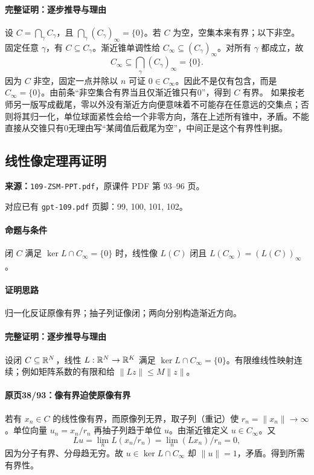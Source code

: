 \paragraph{完整证明：逐步推导与理由}

设 $C=\bigcap_\gamma C_\gamma$，且 $\bigcap_\gamma(C_\gamma)_\infty=\{0\}$。若 $C$ 为空，空集本来有界；以下非空。
固定任意 $\gamma$，有 $C\subseteq C_\gamma$。渐近锥单调性给 $C_\infty\subseteq(C_\gamma)_\infty$。对所有 $\gamma$ 都成立，故
\[C_\infty\subseteq\bigcap_\gamma(C_\gamma)_\infty=\{0\}.\]
因为 $C$ 非空，固定一点并除以 $n$ 可证 $0\in C_\infty$。因此不是仅有包含，而是 $C_\infty=\{0\}$。由前条“非空集合有界当且仅渐近锥只有0”，得到 $C$ 有界。
如果按老师另一版写成截尾，零以外没有渐近方向便意味着不可能存在任意远的交集点；否则将其归一化，单位球面紧性会给一个非零方向，落在上述所有锥中，矛盾。不能直接从交锥只有0无理由写“某阈值后截尾为空”，中间正是这个有界性判据。

\clearpage\subsection{线性像定理再证明}
\textbf{来源：}\texttt{109-ZSM-PPT.pdf}，原课件 PDF 第 93--96 页。\par
对应已有 \texttt{gpt-109.pdf} 页脚：99, 100, 101, 102。\par
\paragraph{命题与条件}闭 $C$ 满足 $\ker L\cap C_\infty=\{0\}$ 时，线性像 $L(C)$ 闭且 $L(C_\infty)=(L(C))_\infty$。
\paragraph{证明思路}归一化反证原像有界；抽子列证像闭；两向分别构造渐近方向。
\paragraph{完整证明：逐步推导与理由}

设闭 $C\subseteq\mathbb{R}^N$，线性 $L:\mathbb{R}^N\to\mathbb{R}^K$ 满足 $\ker L\cap C_\infty=\{0\}$。有限维线性映射连续；例如矩阵系数的有限和给 $\|Lz\|\le M\|z\|$。
\paragraph{原页38/93：像有界迫使原像有界}
若有 $x_n\in C$ 的线性像有界，而原像列无界，取子列（重记）使 $r_n=\|x_n\|\to\infty$。单位向量 $u_n=x_n/r_n$ 再抽子列趋于单位 $u$。由渐近锥定义 $u\in C_\infty$。又
\[Lu=\lim_n L(x_n/r_n)=\lim_n(Lx_n)/r_n=0,\]
因为分子有界、分母趋无穷。故 $u\in\ker L\cap C_\infty$ 却 $\|u\|=1$，矛盾。得到所需有界性。
